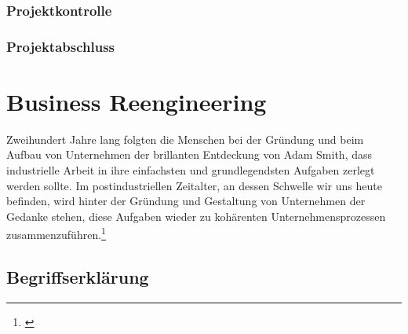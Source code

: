 \subsubsection{Projektkontrolle}

\subsubsection{Projektabschluss}

\section{Business Reengineering}
Zweihundert Jahre lang folgten die Menschen bei der Gründung und beim Aufbau
von Unternehmen der brillanten Entdeckung von Adam Smith, dass industrielle
Arbeit in ihre einfachsten und grundlegendsten Aufgaben zerlegt werden sollte.
Im postindustriellen Zeitalter, an dessen Schwelle wir uns heute befinden,
wird hinter der Gründung und Gestaltung von Unternehmen der Gedanke stehen,
diese Aufgaben wieder zu kohärenten Unternehmensprozessen zusammenzuführen.\footnote{\citealp*[Vgl.][S. 12]{hammer2003business}}

\subsection{Begriffserklärung}

